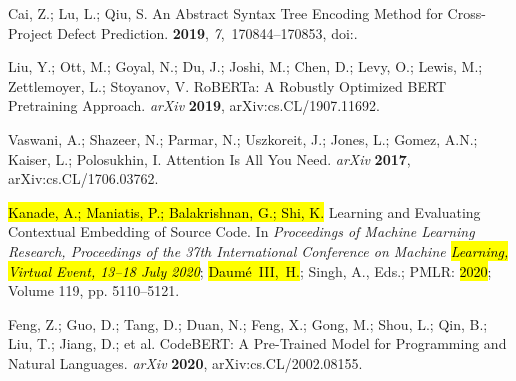\documentclass[mathematics,review,accept,moreauthors,pdftex]{Definitions/mdpi}
\begin{document}
\begin{thebibliography}{999}
{Cai}, Z.; {Lu}, L.; {Qiu}, S.
\newblock An Abstract Syntax Tree Encoding Method for Cross-Project Defect
  Prediction.
 {\bf 2019}, {\em 7},~170844--170853,
\newblock
  doi:{\href{https://doi.org/10.1109/ACCESS.2019.2953696}{}}.

Liu, Y.; Ott, M.; Goyal, N.; Du, J.; Joshi, M.; Chen, D.; Levy, O.; Lewis, M.;
  Zettlemoyer, L.; Stoyanov, V.
\newblock RoBERTa: A Robustly Optimized BERT Pretraining Approach.  \emph{arXiv} \textbf{2019}, arXiv:cs.CL/1907.11692.

Vaswani, A.; Shazeer, N.; Parmar, N.; Uszkoreit, J.; Jones, L.; Gomez, A.N.;
  Kaiser, L.; Polosukhin, I.
\newblock Attention Is All You Need.  \emph{arXiv} \textbf{2017}, arXiv:cs.CL/1706.03762.

\hl{Kanade, A.; Maniatis, P.; Balakrishnan, G.; Shi, K.}
\newblock Learning and Evaluating Contextual Embedding of Source Code.
\newblock  In \emph{Proceedings
  of Machine Learning Research, Proceedings of the 37th International Conference on Machine
  \hl{Learning, Virtual Event, 13--18 July 2020}}; \hl{Daum\'{e}~III,~H.}; Singh, A., Eds.; PMLR:  \hl{2020}; Volume 119, pp. 5110--5121.

Feng, Z.; Guo, D.; Tang, D.; Duan, N.; Feng, X.; Gong, M.; Shou, L.; Qin, B.;
  Liu, T.; Jiang, D.; et al.
\newblock CodeBERT: A Pre-Trained Model for Programming and Natural Languages. \emph{arXiv} \textbf{2020}, arXiv:cs.CL/2002.08155.


\end{thebibliography}
\end{document}
